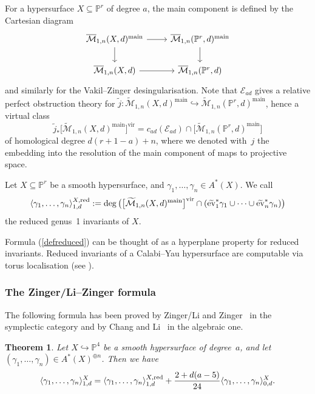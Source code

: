 \documentclass[pdftex]{sigma}
\numberwithin{equation}{section}
\newtheorem{Theorem}{Theorem}[section]
\newcommand{\vv}{\mathrm{vir}}
\newcommand{\PP}{\mathbb P}
\newcommand{\MM}[4]{\overline{\mathcal M}_{#1,#2}(#3,#4)}
\theoremstyle{plain}
\theoremstyle{definition}
\theoremstyle{remark}
\begin{document}
For a hypersurface $X\subseteq \mathbb P^r$ of degree $a$, the main component is defined by the Cartesian diagram
\[
 \begin{tikzcd}
 \MM{1}{n}{X}{d}^\text{main} \ar[r]\ar[d] & \MM{1}{n}{\mathbb P^r}{d}^\text{main} \ar[d] \\
 \MM{1}{n}{X}{d} \ar[r] & \MM{1}{n}{\mathbb P^r}{d}
 \end{tikzcd}
\]
and similarly for the Vakil--Zinger desingularisation. Note that $\mathcal{E}_{ad}$ gives a relative perfect obstruction theory for $\tilde{j}\colon \widetilde{\mathcal M}_{1,n}(X,d)^\text{main} \hookrightarrow\widetilde{\mathcal M}_{1,n}(\mathbb P^r,d)^\text{main} $, hence a virtual class
\begin{equation}\label{defreduced}
\tilde{j}_*\big[\widetilde{\mathcal M}_{1,n}(X,d)^\text{main}\big]^{\vv}=c_{ad}(\mathcal{E}_{ad})\cap\big[\widetilde{\mathcal M}_{1,n}({\mathbb P^r},{d})^\text{main}\big]
\end{equation}
of homological degree $d(r+1-a)+n$, where we denoted with~$j$ the embedding into the resolution of the main component of maps to projective space.

\begin{Definition} Let $X\subseteq \mathbb P^r$ be a smooth hypersurface, and $\gamma_1,\ldots,\gamma_n\in A^*(X)$. We call
\[ \langle\gamma_1,\ldots,\gamma_n\rangle_{1,d}^{X,{\rm red}}:=
\deg \big(\big[\widetilde{\mathcal M}_{1,n}(X,d)^\text{main}\big]^{\vv}\cap( \widetilde{\mathrm{ev}}_1^*\gamma_1\cup\dots\cup \widetilde{\mathrm{ev}}_n^*\gamma_n)\big)
\]
the reduced genus~1 invariants of $X$.
\end{Definition}

\begin{Remark} Formula (\ref{defreduced}) can be thought of as a hyperplane property for reduced invariants. Reduced invariants of a Calabi--Yau hypersurface are computable via torus localisation (see \cite{zingred}).
\end{Remark}

\subsubsection{The Zinger/Li--Zinger formula}
The following formula has been proved by Zinger/Li and Zinger~\cite{LZ, zingerstvsred,redgone} in the symplectic category and by Chang and Li~\cite{CL-formula} in the algebraic one.

\begin{Theorem}\label{lizinger}
 Let $X\hookrightarrow\PP^4$ be a smooth hypersurface of degree~$a$, and let $(\gamma_1,\ldots, \gamma_n)\in A^*(X)^{\oplus n}$. Then we have
 \[
 \langle\gamma_1,\ldots,\gamma_n\rangle^X_{1,d}= \langle\gamma_1,\ldots,\gamma_n\rangle_{1,d}^{X,{\rm red}}+\frac{2+d(a-5)}{24} \langle\gamma_1,\ldots,\gamma_n\rangle^X_{0,d}.
 \]
\end{Theorem}
\end{document}
